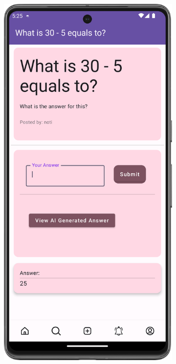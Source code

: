 \begin{figure}[H]
  \begin{subfigure}[b]{0.3\textwidth}
    \includegraphics[width=\textwidth]{Figures/Product_Images/Questions_Answers/view_answer.png}

\end{subfigure}
\end{figure}
